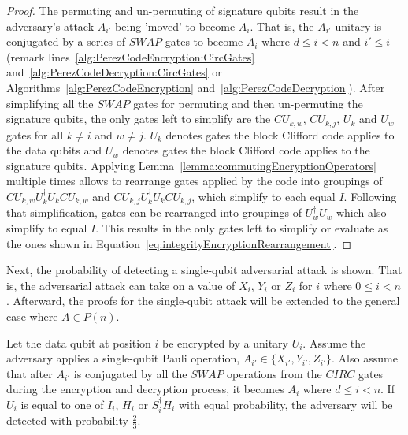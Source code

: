 \begin{proof}
The permuting and un-permuting of signature qubits result in the adversary's attack $A_{i'}$ being 'moved' to become $A_i$. That is, the $A_{i'}$ unitary is conjugated by a series of $\mathit{SWAP}$ gates to become $A_{i}$ where $d \leq i < n$ and $i' \leq i$ (remark lines~\ref{alg:PerezCodeEncryption:CircGates} and~\ref{alg:PerezCodeDecryption:CircGates} or Algorithms~\ref{alg:PerezCodeEncryption} and~\ref{alg:PerezCodeDecryption}). After simplifying all the $\mathit{SWAP}$ gates for permuting and then un-permuting the signature qubits, the only gates left to simplify are the $\mathit{CU}_{k,w}$, $\mathit{CU}_{k,j}$, $U_k$ and $U_w$ gates for all $k \neq i$ and $w \neq j$. $U_k$ denotes gates the block Clifford code applies to the data qubits and $U_w$ denotes gates the block Clifford code applies to the signature qubits. Applying Lemma~\ref{lemma:commutingEncryptionOperators} multiple times allows to rearrange gates applied by the code into groupings of  $\mathit{CU}_{k,w}U_k^{\dagger}U_k\mathit{CU}_{k,w}$ and $\mathit{CU}_{k,j}U_k^{\dagger}U_k\mathit{CU}_{k,j}$, which simplify to each equal $I$. Following that simplification, gates can be rearranged into groupings of $U_w^{\dagger}U_w$ which also simplify to equal $I$. This results in the only gates left to simplify or evaluate as the ones shown in Equation~\eqref{eq:integrityEncryptionRearrangement}.
\end{proof}
Next, the probability of detecting a single-qubit adversarial attack is shown. That is, the adversarial attack can take on a value of $X_i$, $Y_i$ or $Z_i$ for $i$ where $0 \leq i < n$. Afterward, the proofs for the single-qubit attack will be extended to the general case where $A \in P(n)$.
\begin{theorem}
\label{theorem:singleQubitAttackOnDataQubit}
Let the data qubit at position $i$ be encrypted by a unitary $U_i$. Assume the adversary applies a single-qubit Pauli operation, $A_{i'} \in \{X_{i'}, Y_{i'}, Z_{i'}\}$. Also assume that after $A_{i'}$ is conjugated by all the $\mathit{SWAP}$ operations from the $\mathit{CIRC}$ gates during the encryption and decryption process, it becomes $A_i$ where $d \leq i < n$. If $U_i$ is equal to one of $I_i$, $H_i$ or $S_i^{\dagger}H_i$ with equal probability, the adversary will be detected with probability $\frac{2}{3}$.
\end{theorem}
